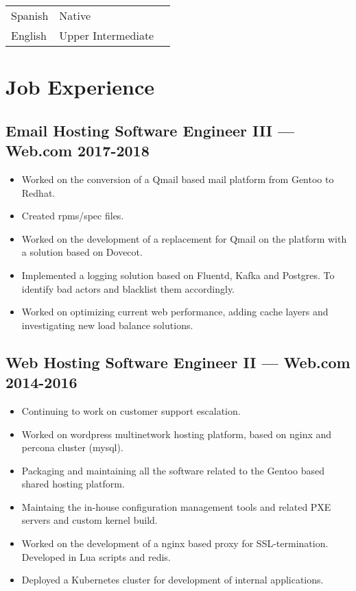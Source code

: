 \documentclass[11pt]{article}
\begin{document}
\begin{tabular}{@{}lll@{}}
  \hspace{.1em} Spanish & Native \\
  \hspace{.1em} English & Upper Intermediate
\end{tabular}


\section{Job Experience}


\subsection{Email Hosting Software Engineer III --- Web.com \hfill 2017-2018}
\begin{itemize}
  \setlength{\parskip}{0pt}
  \setlength{\itemsep}{0pt plus 1pt}
\item Worked on the conversion of a Qmail based mail platform from Gentoo to Redhat.
\item Created rpms/spec files.
\item Worked on the development of a replacement for Qmail on the platform with a solution based on Dovecot.
\item Implemented a logging solution based on Fluentd, Kafka and Postgres. To identify bad actors and blacklist them accordingly.
\item Worked on optimizing current web performance, adding cache layers and investigating new load balance solutions.
\end{itemize}

\subsection{Web Hosting Software Engineer II --- Web.com \hfill 2014-2016}
\begin{itemize}
  \setlength{\parskip}{0pt}
  \setlength{\itemsep}{0pt plus 1pt}
\item Continuing to work on customer support escalation.
\item Worked on wordpress multinetwork hosting platform, based on nginx and percona cluster (mysql).
\item Packaging and maintaining all the software related to the Gentoo based shared hosting platform.
\item Maintaing the in-house configuration management tools and related PXE servers and custom kernel build.
\item Worked on the development of a nginx based proxy for SSL-termination. Developed in Lua scripts and redis.
\item Deployed a Kubernetes cluster for development of internal applications.
\end{itemize}
\end{document}
